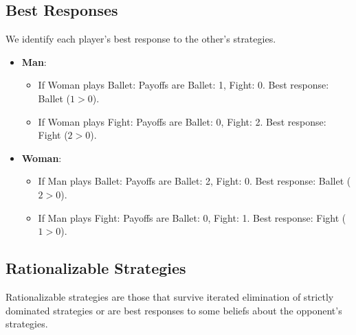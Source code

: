 \documentclass[a4paper,12pt]{article}
\begin{document}
\subsection{Best Responses}
We identify each player's best response to the other's strategies.

\begin{itemize}
\item \textbf{Man}:
\begin{itemize}
\item If Woman plays Ballet: Payoffs are Ballet: 1, Fight: 0. Best response: Ballet ($1 > 0$).
\item If Woman plays Fight: Payoffs are Ballet: 0, Fight: 2. Best response: Fight ($2 > 0$).
\end{itemize}
\item \textbf{Woman}:
\begin{itemize}
\item If Man plays Ballet: Payoffs are Ballet: 2, Fight: 0. Best response: Ballet ($2 > 0$).
\item If Man plays Fight: Payoffs are Ballet: 0, Fight: 1. Best response: Fight ($1 > 0$).
\end{itemize}
\end{itemize}

\subsection{Rationalizable Strategies}
Rationalizable strategies are those that survive iterated elimination of strictly dominated strategies or are best responses to some beliefs about the opponent's strategies.
\end{document}

